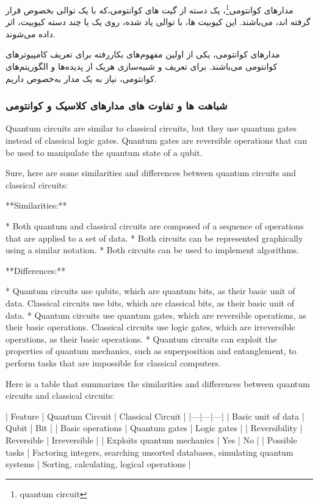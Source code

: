 \documentclass{book}
\begin{document}
مدار‌های ‌کوانتومی\footnote{quantum circuit}، یک دسته از گیت ها‌ی کوانتومی،که با یک توالی بخصوص قرار گرفته اند، ‌می‌باشند. این کیوبیت ها، با توالی یاد شده، روی یک یا چند دسته کیوبیت، اثر داده ‌می‌شوند. 

مدار‌های کوانتومی، یکی از اولین مفهوم‌های بکار‌رفته برای تعریف کامپیوتر‌های کوانتومی‌ می‌باشند. برای تعریف و شبیه‌سازی هریک از پدیده‌ها و الگوریتم‌های کوانتومی، نیاز به یک مدار به‌خصوص داریم.

\subsubsection{شباهت ها و تفاوت های مدارهای کلاسیک و کوانتومی}
Quantum circuits are similar to classical circuits, but they use quantum gates instead of classical logic gates. Quantum gates are reversible operations that can be used to manipulate the quantum state of a qubit.

Sure, here are some similarities and differences between quantum circuits and classical circuits:

**Similarities:**

* Both quantum and classical circuits are composed of a sequence of operations that are applied to a set of data.
* Both circuits can be represented graphically using a similar notation.
* Both circuits can be used to implement algorithms.

**Differences:**

* Quantum circuits use qubits, which are quantum bits, as their basic unit of data. Classical circuits use bits, which are classical bits, as their basic unit of data.
* Quantum circuits use quantum gates, which are reversible operations, as their basic operations. Classical circuits use logic gates, which are irreversible operations, as their basic operations.
* Quantum circuits can exploit the properties of quantum mechanics, such as superposition and entanglement, to perform tasks that are impossible for classical computers.

Here is a table that summarizes the similarities and differences between quantum circuits and classical circuits:

| Feature | Quantum Circuit | Classical Circuit |
|---|---|---|
| Basic unit of data | Qubit | Bit |
| Basic operations | Quantum gates | Logic gates |
| Reversibility | Reversible | Irreversible |
| Exploits quantum mechanics | Yes | No |
| Possible tasks | Factoring integers, searching unsorted databases, simulating quantum systems | Sorting, calculating, logical operations |
\end{document}
